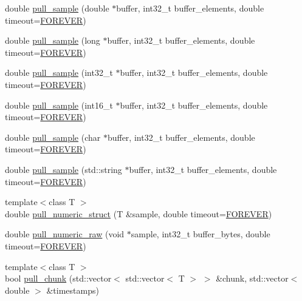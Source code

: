 \begin{DoxyCompactItemize}
\item 
double \hyperlink{classlsl_1_1stream__inlet_acb78fe666a3be090278bc3d1f3eb7619}{pull\+\_\+sample} (double $\ast$buffer, int32\+\_\+t buffer\+\_\+elements, double timeout=\hyperlink{namespacelsl_a74cfbc9077aca21295117217249721ed}{F\+O\+R\+E\+V\+ER})
\item 
double \hyperlink{classlsl_1_1stream__inlet_a774c17a647ebd321b5ce4a5450f71202}{pull\+\_\+sample} (long $\ast$buffer, int32\+\_\+t buffer\+\_\+elements, double timeout=\hyperlink{namespacelsl_a74cfbc9077aca21295117217249721ed}{F\+O\+R\+E\+V\+ER})
\item 
double \hyperlink{classlsl_1_1stream__inlet_ae4534102453ccd98f319c746ec1de0a9}{pull\+\_\+sample} (int32\+\_\+t $\ast$buffer, int32\+\_\+t buffer\+\_\+elements, double timeout=\hyperlink{namespacelsl_a74cfbc9077aca21295117217249721ed}{F\+O\+R\+E\+V\+ER})
\item 
double \hyperlink{classlsl_1_1stream__inlet_a3462f2634ce13e7f9c764e16a58a71a6}{pull\+\_\+sample} (int16\+\_\+t $\ast$buffer, int32\+\_\+t buffer\+\_\+elements, double timeout=\hyperlink{namespacelsl_a74cfbc9077aca21295117217249721ed}{F\+O\+R\+E\+V\+ER})
\item 
double \hyperlink{classlsl_1_1stream__inlet_a9183e81a122df862eff9ea9797c82b73}{pull\+\_\+sample} (char $\ast$buffer, int32\+\_\+t buffer\+\_\+elements, double timeout=\hyperlink{namespacelsl_a74cfbc9077aca21295117217249721ed}{F\+O\+R\+E\+V\+ER})
\item 
double \hyperlink{classlsl_1_1stream__inlet_a52e95747438991868e3eb9c791e24f42}{pull\+\_\+sample} (std\+::string $\ast$buffer, int32\+\_\+t buffer\+\_\+elements, double timeout=\hyperlink{namespacelsl_a74cfbc9077aca21295117217249721ed}{F\+O\+R\+E\+V\+ER})
\item 
{\footnotesize template$<$class T $>$ }\\double \hyperlink{classlsl_1_1stream__inlet_a540c7ba2c23188916ffe311c26c2c081}{pull\+\_\+numeric\+\_\+struct} (T \&sample, double timeout=\hyperlink{namespacelsl_a74cfbc9077aca21295117217249721ed}{F\+O\+R\+E\+V\+ER})
\item 
double \hyperlink{classlsl_1_1stream__inlet_ae8f7beaaa82d192d844abdd1531f6b9a}{pull\+\_\+numeric\+\_\+raw} (void $\ast$sample, int32\+\_\+t buffer\+\_\+bytes, double timeout=\hyperlink{namespacelsl_a74cfbc9077aca21295117217249721ed}{F\+O\+R\+E\+V\+ER})
\item 
{\footnotesize template$<$class T $>$ }\\bool \hyperlink{classlsl_1_1stream__inlet_af9051121db6ffa6945bd2288b2bf2a15}{pull\+\_\+chunk} (std\+::vector$<$ std\+::vector$<$ T $>$ $>$ \&chunk, std\+::vector$<$ double $>$ \&timestamps)

\end{DoxyCompactItemize}
